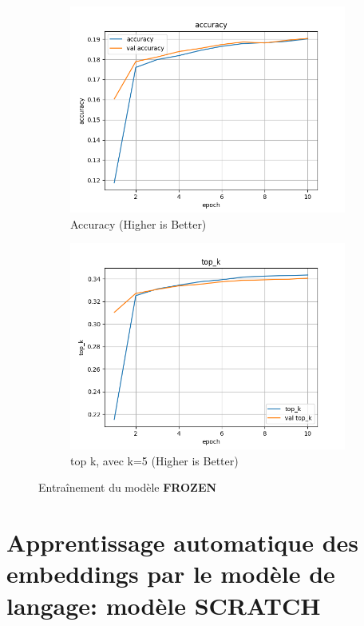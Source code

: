 \documentclass[a4paper]{article}
\begin{document}
\begin{figure}[ht]
  \begin{subfigure}{0.47\textwidth}
    \includegraphics[width=\linewidth]{../logs/word2vect/accuracy.png}
    \caption{Accuracy (Higher is Better)}
  \end{subfigure}
  \hfill
  \begin{subfigure}{0.47\textwidth}
    \includegraphics[width=\linewidth]{../logs/word2vect/top_k.png}
    \caption{top k, avec k=5 (Higher is Better)}
  \end{subfigure}
  \caption{Entraînement du modèle \textbf{FROZEN}}
  \label{subfig:result model 1}
\end{figure}


\section{Apprentissage automatique des embeddings par le modèle de langage: modèle \textbf{SCRATCH}}
\end{document}
